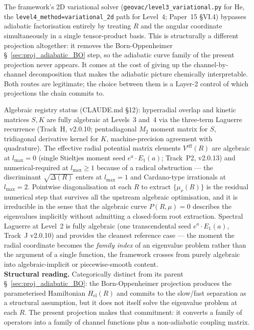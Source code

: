 \documentclass[11pt]{article}
\begin{document}
The framework's 2D variational solver
(\texttt{geovac/level3\_variational.py} for He, the
\texttt{level4\_method=\textquotesingle variational\_2d\textquotesingle}
path for Level~4; Paper~15 §VI.4) bypasses adiabatic factorisation
entirely by treating $R$ and the angular coordinate simultaneously in
a single tensor-product basis.  This is structurally a different
projection altogether: it removes the Born-Oppenheimer
\S~\ref{sec:proj_adiabatic_BO} step, so the adiabatic curve
family of the present projection never appears.  It comes at the cost
of giving up the channel-by-channel decomposition that makes the
adiabatic picture chemically interpretable.  Both routes are
legitimate; the choice between them is a Layer-2 control of which
projections the chain commits to.

Algebraic registry status (CLAUDE.md §12): hyperradial overlap and
kinetic matrices $S, K$ are fully algebraic at Levels~3 and~4 via the
three-term Laguerre recurrence (Track~H, v2.0.10; pentadiagonal $M_2$
moment matrix for $S$, tridiagonal derivative kernel for $K$,
machine-precision agreement with quadrature).  The effective radial
potential matrix elements $V^\text{eff}(R)$ are algebraic at
$l_\text{max} = 0$ (single Stieltjes moment seed $e^a \cdot E_1(a)$;
Track~P2, v2.0.13) and numerical-required at $l_\text{max} \geq 1$
because of a radical obstruction --- the discriminant $\sqrt{\Delta(R)}$
enters at $l_\text{max}=1$ and Cardano-type irrationals at
$l_\text{max}=2$.  Pointwise diagonalisation at each $R$ to extract
$\{\mu_\nu(R)\}$ is the residual numerical step that survives all the
upstream algebraic optimisation, and it is irreducible in the sense
that the algebraic curve $P(R, \mu) = 0$ describes the eigenvalues
implicitly without admitting a closed-form root extraction.  Spectral
Laguerre at Level~2 is fully algebraic (one transcendental seed
$e^a \cdot E_1(a)$, Track~J v2.0.10) and provides the cleanest
reference case --- the moment the radial coordinate becomes the
\emph{family index} of an eigenvalue problem rather than the argument
of a single function, the framework crosses from purely algebraic
into algebraic-implicit or piecewise-smooth content.\\
\textbf{Structural reading.}  Categorically distinct from its parent
\S~\ref{sec:proj_adiabatic_BO}: the Born-Oppenheimer projection
produces the parameterised Hamiltonian $H_\text{el}(R)$ and commits to
the slow/fast separation as a structural assumption, but it does not
itself solve the eigenvalue problem at each $R$.  The present
projection makes that commitment: it converts a family of operators
into a family of channel functions plus a non-adiabatic coupling
matrix.
\end{document}
